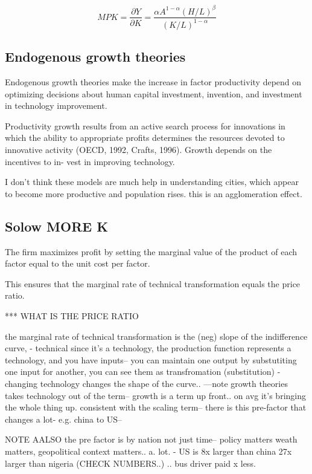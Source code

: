    \[ MPK={\frac {\partial Y}{\partial K}}=\frac {\alpha A^{1-\alpha }(H/L)^{\beta }}{(K/L)^{1-\alpha} }\]
 
 \subsection{Endogenous growth theories}  
 Endogenous growth theories make the increase in factor productivity depend on  optimizing decisions about human capital investment, invention, and investment in technology improvement.  
 
  Productivity growth results from an active search process for innovations in
which the ability to appropriate profits determines the resources devoted to
innovative activity (OECD, 1992, Crafts, 1996). Growth depends on the incentives to in-
vest in improving technology.%
 
  I don't think these models are much help in understanding cities, which appear to become more productive and population rises. this is an agglomeration effect.



\subsection{Solow MORE K}

The firm maximizes profit by setting the marginal value of the product of each factor equal to the unit cost per factor. 

This ensures that the marginal rate of technical transformation equals the price ratio. 

*** WHAT IS THE PRICE RATIO

the marginal rate of technical transformation is the (neg) slope of the indifference curve, 
- technical since it's a technology, the production function represents a technology, and you have inputs-- you can maintain one output by substutiting one input for another, you can see them as transfromation (substitution)
- changing technology changes the shape of the curve.. ---note growth theories takes technology out of the term-- growth is a term up front.. on avg it's bringing the whole thing up. consistent with the scaling term-- there is this pre-factor that changes a lot- e.g. china to US-- 

NOTE AALSO  the pre factor is by nation not just time-- policy matters weath matters, geopolitical context matters.. a. lot. - US is 8x larger than china 27x larger than nigeria (CHECK NUMBERS..) .. bus driver paid x less.


